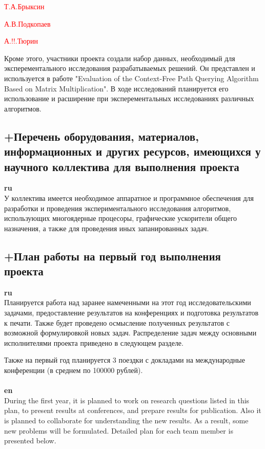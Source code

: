 \documentclass[12pt]{article}  %
\theoremstyle{remark}
\newcommand{\checkme}[1]{\textcolor{red}{#1}}
\begin{document}
\checkme{Т.А.Брыксин}

\checkme{А.В.Подкопаев}

\checkme{А.!!.Тюрин}

Кроме этого, участники проекта создали набор данных, необходимый для эксперементального исследования разрабатываемых решений. Он представлен и используется в работе "Evaluation of the Context-Free Path Querying Algorithm Based on Matrix Multiplication". В ходе исследований планируется его использование и расширение при эксперементальных исследованиях различных алгоритмов.


\subsection{+Перечень оборудования, материалов, информационных и других ресурсов, имеющихся у научного коллектива для выполнения проекта}
\textbf{ru}\\
%
У коллектива имеется необходимое аппаратное и программное обеспечения для разработки и проведения экспериментального исследования алгоритмов, использующих многоядерные процесоры, графические ускорители общего назначения, а также для проведения иных запанированных задач.

\subsection{+План работы на первый год выполнения проекта}

\textbf{ru}\\

Планируется работа над заранее намеченными на этот год исследовательскими задачами, предоставление результатов на конференциях и подготовка результатов к печати. Также будет проведено осмысление полученных результатов с возможной формулировкой новых задач. Распределение задач между основными исполнителями проекта приведено в следующем разделе.

Также на первый год планируется 3 поездки с докладами на международные конференции (в среднем по 100000 рублей).
\\
\\
\textbf{en}\\
During the first year, it is planned to work on research questions listed in this plan, to present results at conferences, and prepare results for publication. Also it is planned to collaborate for understanding the new results. As a result, some new problems will be formulated. Detailed plan for each team member is presented below.
\end{document}
